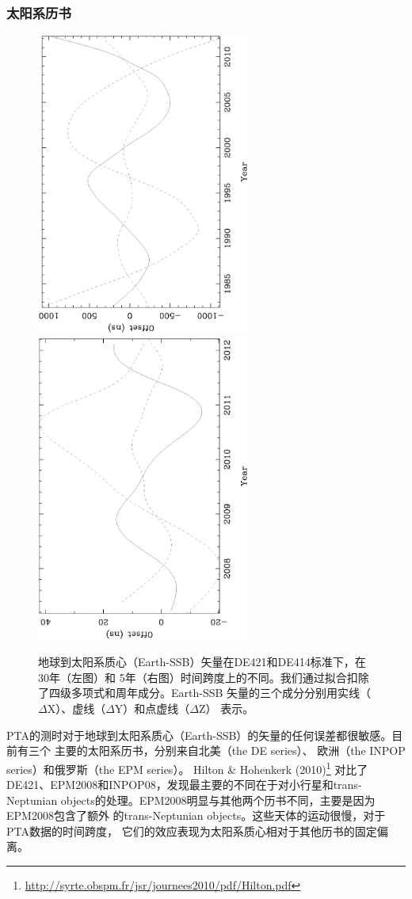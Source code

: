\subsubsection{太阳系历书}
\begin{figure}
\includegraphics[angle=-90,width=7cm]{ephem1.ps}
\includegraphics[angle=-90,width=7cm]{ephem2.ps}
\caption{地球到太阳系质心（Earth-SSB）矢量在DE421和DE414标准下，在30年（左图）和
5年（右图）时间跨度上的不同。我们通过拟合扣除了四级多项式和周年成分。Earth-SSB
矢量的三个成分分别用实线（$\Delta$X）、虚线（$\Delta$Y）和点虚线（$\Delta$Z）
表示。} 
\label{fg:ephDiff}
\end{figure}

PTA的测时对于地球到太阳系质心（Earth-SSB）的矢量的任何误差都很敏感。目前有三个
主要的太阳系历书，分别来自北美（the DE series）\supercite{nsw83}、
欧洲（the INPOP series）\supercite{fmlg08}和俄罗斯（the EPM series）\supercite{pit05}。
Hilton \& Hohenkerk (2010)\footnote{\url{http://syrte.obspm.fr/jsr/journees2010/pdf/Hilton.pdf}}
对比了DE421、EPM2008和INPOP08，发现最主要的不同在于对小行星和trans-Neptunian 
objects的处理。EPM2008明显与其他两个历书不同，主要是因为EPM2008包含了额外
的trans-Neptunian objects。这些天体的运动很慢，对于PTA数据的时间跨度，
它们的效应表现为太阳系质心相对于其他历书的固定偏离。

